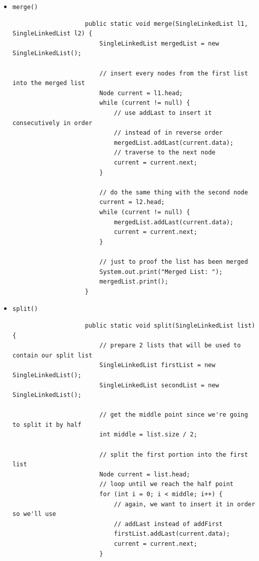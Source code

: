 \documentclass[12pt,titlepage]{article}
\begin{document}
\begin{enumerate}
{        \begin{itemize}
            \item {
                \texttt{merge()}
                \begin{verbatim}
                    public static void merge(SingleLinkedList l1, SingleLinkedList l2) {
                        SingleLinkedList mergedList = new SingleLinkedList();

                        // insert every nodes from the first list into the merged list
                        Node current = l1.head;
                        while (current != null) {
                            // use addLast to insert it consecutively in order
                            // instead of in reverse order
                            mergedList.addLast(current.data);
                            // traverse to the next node
                            current = current.next;
                        }

                        // do the same thing with the second node
                        current = l2.head;
                        while (current != null) {
                            mergedList.addLast(current.data);
                            current = current.next;
                        }

                        // just to proof the list has been merged
                        System.out.print("Merged List: ");
                        mergedList.print();
                    }
                \end{verbatim}
            }
            \item {
                \texttt{split()}
                \begin{verbatim}
                    public static void split(SingleLinkedList list) {
                        // prepare 2 lists that will be used to contain our split list
                        SingleLinkedList firstList = new SingleLinkedList();
                        SingleLinkedList secondList = new SingleLinkedList();

                        // get the middle point since we're going to split it by half
                        int middle = list.size / 2;

                        // split the first portion into the first list
                        Node current = list.head;
                        // loop until we reach the half point
                        for (int i = 0; i < middle; i++) {
                            // again, we want to insert it in order so we'll use 
                            // addLast instead of addFirst
                            firstList.addLast(current.data);
                            current = current.next;
                        }


\end{verbatim}}
\end{itemize}}
\end{enumerate}
\end{document}
